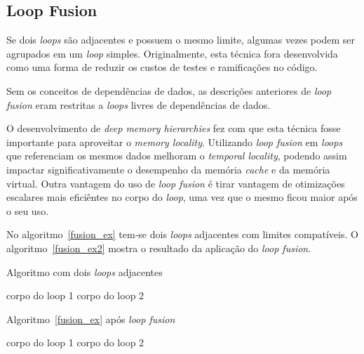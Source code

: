 
\subsection{Loop Fusion}

Se dois \textit{loops} são adjacentes e possuem o mesmo limite, algumas vezes
podem ser agrupados em um \textit{loop} simples.
Originalmente, esta técnica fora desenvolvida como uma forma de reduzir os
custos de testes e ramificações no código.

Sem os conceitos de dependências de dados, as descrições anteriores de
\textit{loop fusion} eram restritas a \textit{loops} livres de dependências de
dados. 

O desenvolvimento de \textit{deep memory hierarchies} fez com que esta técnica
fosse importante para aproveitar o \textit{memory locality}.
Utilizando \textit{loop fusion} em \textit{loops} que referenciam os mesmos
dados melhoram o \textit{temporal locality}, podendo assim impactar 
significativamente o desempenho da memória \textit{cache} e da memória virtual.
Outra vantagem do uso de \textit{loop fusion} é tirar vantagem de otimizações 
escalares mais eficiêntes no corpo do \textit{loop}, uma vez que o mesmo ficou
maior após o seu uso.

No algoritmo~\ref{fusion_ex} tem-se dois \textit{loops} adjacentes com limites
compatíveis. 
O algoritmo~\ref{fusion_ex2} mostra o resultado da aplicação do 
\textit{loop fusion}.

\begin{algorithm}
\caption{Algoritmo com dois \textit{loops} adjacentes}
\label{fusion_ex}
\begin{algorithmic}[1]

\STATE corpo do loop 1
\ENDFOR
{}
\STATE corpo do loop 2
\ENDFOR

\end{algorithmic}
\end{algorithm}

\begin{algorithm}
\caption{Algoritmo~\ref{fusion_ex} após \textit{loop fusion}}
\label{fusion_ex2}
\begin{algorithmic}[1]

\STATE corpo do loop 1
\STATE corpo do loop 2
\ENDFOR

\end{algorithmic}
\end{algorithm}

